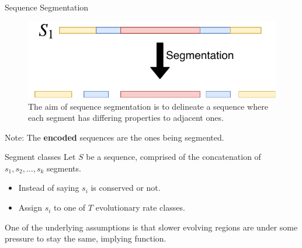 \documentclass{beamer}
\begin{document}
     \begin{frame}{Sequence Segmentation}
        \begin{figure}
            \centering
            \includegraphics{Segmentation.pdf}
            \caption{The aim of sequence segmentation is to delineate a sequence where each segment has differing properties to adjacent ones.}
            \label{fig:Segmentation}
        \end{figure}
        
         Note: The \textbf{encoded} sequences are the ones being segmented.
    \end{frame}
    
    \begin{frame}{Segment classes}
        Let $S$ be a sequence, comprised of the concatenation of $s_1,s_2,\ldots,s_k$ segments. 
        
            \begin{itemize}
                \item Instead of saying $s_i$ is conserved or not.
                \item Assign $s_i$ to one of $T$ evolutionary rate classes.
            \end{itemize}
        One of the underlying assumptions is that slower evolving regions are under some pressure to stay the same, implying function.
    \end{frame}
    
\end{document}
